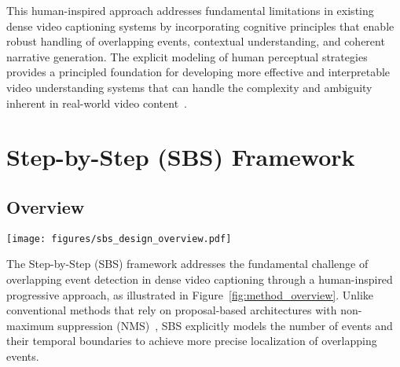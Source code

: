 This human-inspired approach addresses fundamental limitations in existing dense video captioning systems by incorporating cognitive principles that enable robust handling of overlapping events, contextual understanding, and coherent narrative generation. The explicit modeling of human perceptual strategies provides a principled foundation for developing more effective and interpretable video understanding systems that can handle the complexity and ambiguity inherent in real-world video content~\cite{bhooshan2022multimodal,li2022adaptive}.



\section{Step-by-Step (SBS) Framework}

\subsection{Overview} 
\label{subsec:method_overview}

\begin{figure*}[t]
  \centering
  \texttt{[image: figures/sbs\_design\_overview.pdf]}
  \caption{
    Overview of the Step-by-Step (SBS) framework for dense video captioning.
    (1) \textbf{Video encoder}: Extracts spatiotemporal features using C3D networks and encodes long-range temporal dependencies via transformer encoder.
    (2) \textbf{Temporal event counter}: Explicitly estimates the number of events at each temporal location.
    (3) \textbf{Temporal boundary classifier}: Localizes event start and end boundaries along the timeline.
    (4) \textbf{Event proposal generation}: Generates event proposals from predicted counts and boundaries without relying on hand-crafted selection algorithms.
    (5) \textbf{Context-level event encoder}: Encodes sequences of event proposals to capture inter-event dependencies.
    (6) \textbf{Sequential event captioner}: Generates natural language descriptions for each localized event using context-aware features.
  }
  \label{fig:method_overview}
\end{figure*}

The Step-by-Step (SBS) framework addresses the fundamental challenge of overlapping event detection in dense video captioning through a human-inspired progressive approach, as illustrated in Figure~\ref{fig:method_overview}. 
Unlike conventional methods that rely on proposal-based architectures with non-maximum suppression (NMS)~\cite{Krishna2017-pw,Li2018-ll}, SBS explicitly models the number of events and their temporal boundaries to achieve more precise localization of overlapping events.


